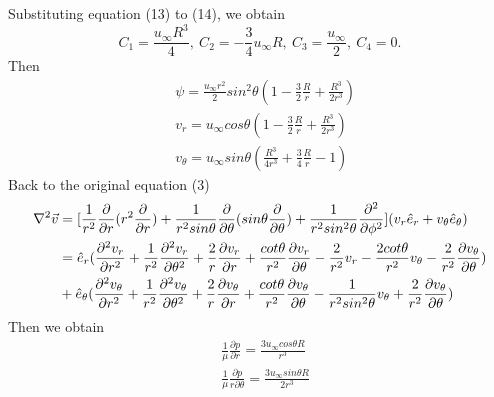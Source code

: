 \documentclass{report}
\begin{document}
Substituting equation (13) to (14), we obtain
\begin{equation}
    C_1 = \frac{u_{\infty}R^3}{4},~C_2 = -\frac{3}{4}u_{\infty}R,~C_3 = \frac{u_{\infty}}{2},~C_4 = 0.
\end{equation}
Then 
\begin{equation}
\begin{aligned}
    &\psi = \frac{u_{\infty}r^2}{2}sin^2\theta(1-\frac{3}{2}\frac{R}{r} + \frac{R^3}{2r^3}) \\
    &v_{r} = u_{\infty}cos\theta(1-\frac{3}{2}\frac{R}{r} + \frac{R^3}{2r^3}) \\
    &v_{\theta} = u_{\infty}sin\theta(\frac{R^3}{4r^3} + \frac{3}{4} \frac{R}{r} - 1)
\end{aligned}
\end{equation}
\indent Back to the original equation (3)
\begin{equation}
\begin{aligned}
    \nabla^2 \vec v &= [\frac{1}{r^2}\frac{\partial}{\partial r}(r^2 \frac{\partial}{\partial r}) + \frac{1}{r^2sin\theta}\frac{\partial}{\partial \theta} (sin\theta \frac{\partial}{\partial \theta} ) + \frac{1}{r^2 sin^2\theta} \frac{\partial^2}{\partial \phi^2}](v_r \hat e_r + v_{\theta} \hat e_{\theta}) \\
    & = \hat e_r (\frac{\partial^2 v_r}{\partial r^2} + \frac{1}{r^2} \frac{\partial^2 v_r}{\partial \theta^2} + \frac{2}{r} \frac{\partial v_r}{\partial r} + \frac{cot\theta}{r^2}\frac{\partial v_r}{\partial \theta} - \frac{2}{r^2}v_r -\frac{2cot\theta}{r^2}v_{\theta} -\frac{2}{r^2}\frac{\partial v_{\theta}}{\partial \theta}) \\ &+
    \hat e_{\theta}(\frac{\partial^2 v_{\theta}}{\partial r^2} + \frac{1}{r^2} \frac{\partial^2 v_{\theta}}{\partial \theta^2} + \frac{2}{r}\frac{\partial v_{\theta}}{\partial r} + \frac{cot\theta}{r^2} \frac{\partial v_{\theta}}{\partial \theta} - \frac{1}{r^2 sin^2 \theta}v_{\theta} + \frac{2}{r^2} \frac{\partial v_{\theta}}{\partial \theta}) \notag
\end{aligned}
\end{equation}
\noindent Then we obtain
\begin{equation}
\begin{aligned}
    &\frac{1}{\mu} \frac{\partial p}{\partial r} = \frac{3u_{\infty}cos\theta R}{r^3} \\ &\frac{1}{\mu} \frac{\partial p}{r \partial \theta} = \frac{3u_{\infty}sin\theta R}{2r^3}
\end{aligned}
\end{equation}
\end{document}
